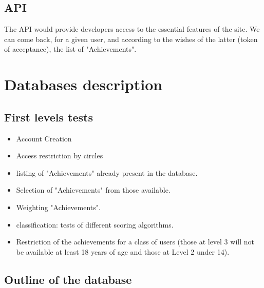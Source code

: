 \documentclass{life-fr}
\begin{document}
\section{API}

The API would provide developers access to the essential features of the site. We can come back, for a given user, and according to the wishes of the latter (token of acceptance), the list of "Achievements".

\chapter{Databases description}

\section{First levels tests}

\begin{itemize}
  \item Account Creation
  \item Access restriction by circles
  \item listing of "Achievements" already present in the database.
  \item Selection of "Achievements" from those available.
  \item Weighting "Achievements".
  \item classification: tests of different scoring algorithms.
  \item Restriction of the achievements for a class of users (those at level 3 will not be available at least 18 years of age and those at Level 2 under 14).
\end{itemize}

\section{Outline of the database}
\end{document}
